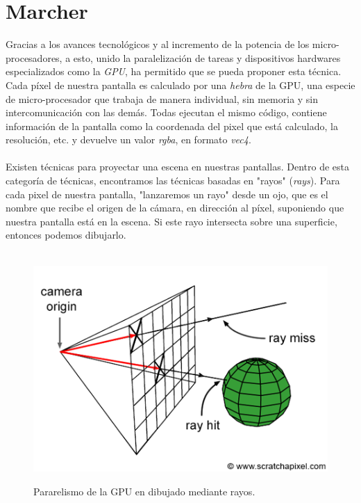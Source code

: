 \chapter{Marcher}
Gracias a los avances tecnológicos y al incremento de la potencia de los micro-procesadores, a esto, unido la paralelización de tareas y dispositivos hardwares especializados como la \textit{GPU}, ha permitido que se pueda proponer esta técnica. Cada píxel de nuestra pantalla es calculado por una \textit{hebra} de la GPU, una especie de micro-procesador que trabaja de manera individual, sin memoria y sin intercomunicación con las demás. Todas ejecutan el mismo código, contiene información de la pantalla como la coordenada del pixel que está calculado, la resolución, etc. y devuelve un valor \textit{rgba}, en formato \textit{vec4}.\\\\
Existen técnicas para proyectar una escena en nuestras pantallas. Dentro de esta categoría de técnicas, encontramos las técnicas basadas en "rayos" (\textit{rays}). Para cada pixel de nuestra pantalla, "lanzaremos un rayo" desde un ojo, que es el nombre que recibe el origen de la cámara, en dirección al píxel, suponiendo que nuestra pantalla está en la escena. Si este rayo intersecta sobre una superficie, entonces podemos dibujarlo.\\\\
\begin{figure}[H]
  \centering
  \captionsetup{justification=centering}
  \includegraphics[width=1.0\textwidth]{secciones/imagenes/gpu.png}\label{fig:marcher}
  \caption{Pararelismo de la GPU en dibujado mediante rayos.}
\end{figure}
